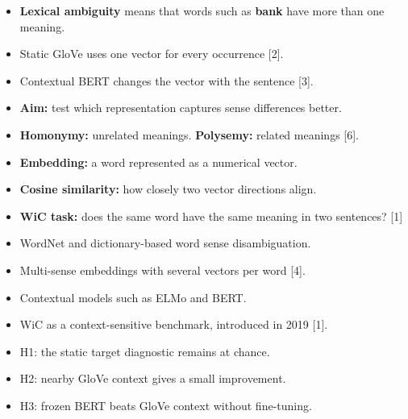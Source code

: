 \documentclass{article}
\begin{document}
\bodyfont
{}

\noindent
\begin{minipage}[t][530mm][s]{0.485\textwidth}\vspace{0pt}\RaggedRight
{}
\begin{itemize}
\item \textbf{Lexical ambiguity} means that words such as \textbf{bank} have more than one meaning.
\item Static GloVe uses one vector for every occurrence [2].
\item Contextual BERT changes the vector with the sentence [3].
\item \textbf{Aim:} test which representation captures sense differences better.
\end{itemize}

\vfill
{}
\begin{itemize}
\item \textbf{Homonymy:} unrelated meanings. \textbf{Polysemy:} related meanings [6].
\item \textbf{Embedding:} a word represented as a numerical vector.
\item \textbf{Cosine similarity:} how closely two vector directions align.
\item \textbf{WiC task:} does the same word have the same meaning in two sentences? [1]
\end{itemize}

\vfill
{}
\begin{itemize}
\item WordNet and dictionary-based word sense disambiguation.
\item Multi-sense embeddings with several vectors per word [4].
\item Contextual models such as ELMo and BERT.
\item WiC as a context-sensitive benchmark, introduced in 2019 [1].
\end{itemize}

\vfill
{}
\begin{itemize}
\item H1: the static target diagnostic remains at chance.
\item H2: nearby GloVe context gives a small improvement.
\item H3: frozen BERT beats GloVe context without fine-tuning.
\end{itemize}
\end{minipage}\hfill
\end{document}
